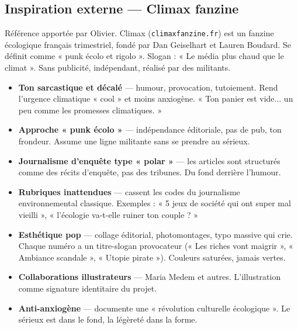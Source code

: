 \documentclass[a4paper,11pt]{article}
\begin{document}
\subsection{Inspiration externe — Climax fanzine}

Référence apportée par Olivier. Climax (\texttt{climaxfanzine.fr}) est un fanzine écologique français trimestriel, fondé par Dan Geiselhart et Lauren Boudard. Se définit comme « punk écolo et rigolo ». Slogan : « Le média plus chaud que le climat ». Sans publicité, indépendant, réalisé par des militants.

\begin{tcolorbox}[highlight card, title=ADN Climax — ce qui le définit]
\begin{itemize}[nosep, leftmargin=12pt]
  \item \textbf{Ton sarcastique et décalé} — humour, provocation, tutoiement. Rend l'urgence climatique « cool » et moins anxiogène. « Ton panier est vide... un peu comme les promesses climatiques. »
  \item \textbf{Approche « punk écolo »} — indépendance éditoriale, pas de pub, ton frondeur. Assume une ligne militante sans se prendre au sérieux.
  \item \textbf{Journalisme d'enquête type « polar »} — les articles sont structurés comme des récits d'enquête, pas des tribunes. Du fond derrière l'humour.
  \item \textbf{Rubriques inattendues} — cassent les codes du journalisme environnemental classique. Exemples : « 5 jeux de société qui ont super mal vieilli », « l'écologie va-t-elle ruiner ton couple ? »
  \item \textbf{Esthétique pop} — collage éditorial, photomontages, typo massive qui crie. Chaque numéro a un titre-slogan provocateur (« Les riches vont maigrir », « Ambiance scandale », « Utopie pirate »). Couleurs saturées, jamais vertes.
  \item \textbf{Collaborations illustrateurs} — Maria Medem et autres. L'illustration comme signature identitaire du projet.
  \item \textbf{Anti-anxiogène} — documente une « révolution culturelle écologique ». Le sérieux est dans le fond, la légèreté dans la forme.
\end{itemize}
\end{tcolorbox}
\end{document}
